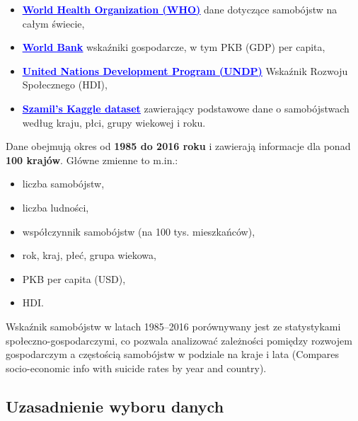 \documentclass[polish]{article}
\begin{document}
    \begin{itemize}
        \item \textbf{{\href{http://www.who.int/mental_health/suicide-prevention/en/}{\textcolor{blue}{\uline{World Health Organization (WHO)}}}}} \textendash \hspace{1mm} dane dotyczące samobójstw na całym świecie,
        \item \textbf{{\href{http://databank.worldbank.org/data/source/world-development-indicators#}{\textcolor{blue}{\uline{World Bank}}}}} \textendash \hspace{1mm} wskaźniki gospodarcze, w tym PKB (GDP) per capita,
        \item \textbf{{\href{http://hdr.undp.org/en/indicators/137506}{\textcolor{blue}{\uline{United Nations Development Program (UNDP)}}}}} \textendash \hspace{1mm} Wskaźnik Rozwoju Społecznego (HDI),
        \item \textbf{\href{https://www.kaggle.com/szamil/suicide-in-the-twenty-first-century/notebook}{\textcolor{blue}{\uline{Szamil’s Kaggle dataset}}}} \textendash \hspace{1mm} zawierający podstawowe dane o samobójstwach według kraju, płci, grupy wiekowej i roku.
    \end{itemize}

    Dane obejmują okres od \textbf{1985 do 2016 roku} i zawierają informacje dla ponad \textbf{100 krajów}. Główne zmienne to m.in.:

    \begin{itemize}
        \item liczba samobójstw,
        \item liczba ludności,
        \item współczynnik samobójstw (na 100 tys. mieszkańców),
        \item rok, kraj, płeć, grupa wiekowa,
        \item PKB per capita (USD),
        \item HDI.
    \end{itemize}

    Wskaźnik samobójstw w latach 1985–2016 porównywany jest ze statystykami społeczno-gospodarczymi, co pozwala analizować zależności pomiędzy rozwojem gospodarczym a częstością samobójstw w podziale na kraje i lata (Compares socio-economic info with suicide rates by year and country).

    \subsection{Uzasadnienie wyboru danych}
\end{document}
